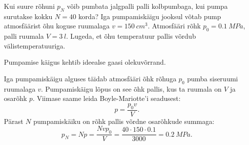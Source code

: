 
Kui suure rõhuni $p_N$ võib pumbata jalgpalli palli kolbpumbaga, kui pumpa surutakse kokku $N = 40$ korda? Iga pumpamiskäigu jooksul võtab pump atmosfäärist õhu koguse ruumalaga $v = \SI{150}{cm^3}$. Atmosfääri rõhk $p_0 = \SI{0,1}{MPa}$, palli ruumala $V = \SI{3}{l}$. Lugeda, et õhu temperatuur pallis võrdub välistemperatuuriga.

\hint
Pumpamise käigus kehtib ideealse gaasi olekuvõrrand.

\solu
Iga pumpamiskäigu alguses täidab atmosfääri õhk rõhuga  $p_0$ pumba siseruumi ruumalaga $v$. Pumpamiskäigu lõpus on see õhk pallis, kus ta ruumala on $V$ ja osarõhk $p$. Viimase saame leida Boyle-Mariotte’i seadusest:
\[
p = \frac{p_0v}{V}.
\]
Pärast $N$ pumpamiskäiku on rõhk pallis võrdne osarõhkude summaga:
\[
p_{N}=N p=\frac{N v p_{0}}{V}=\frac{40 \cdot 150 \cdot \num{0,1}}{3000}=\SI{0,2}{MPa}.
\]
\probend